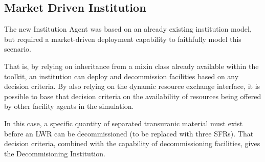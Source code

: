 
\label{sec:mktdriveninst}
\subsection{Market Driven Institution}
The new Institution Agent was based on an already existing institution
model, but required a market-driven deployment capability to
faithfully model this scenario. 

That is, by relying on inheritance from a mixin class already available within 
the \Cyclus toolkit, an institution can deploy and decommission facilities 
based on any decision criteria. By also relying on the dynamic resource 
exchange interface, it is possible to base that decision criteria on the 
availability of resources being offered by other facility agents in the 
simulation. 

In this case, a specific quantity of separated transuranic material must exist 
before an LWR can be decommissioned (to be replaced with three SFRs). That 
decision criteria, combined with the capability of decommissioning facilities, 
gives the Decommisioning Institution. 


